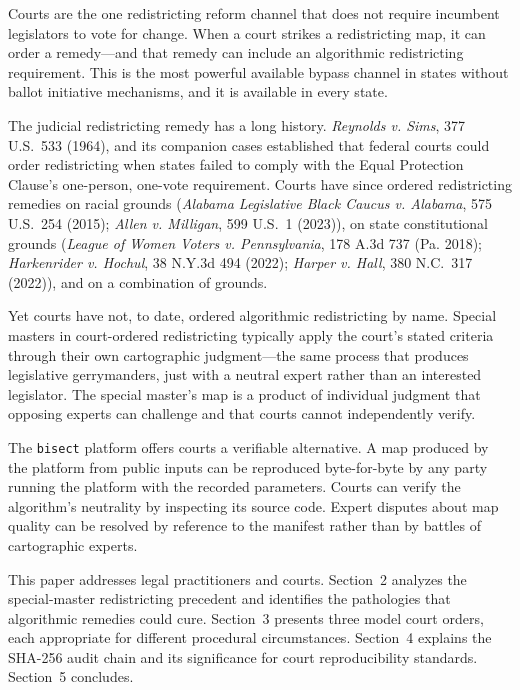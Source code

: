 Courts are the one redistricting reform channel that does not require incumbent legislators to vote for change. When a court strikes a redistricting map, it can order a remedy---and that remedy can include an algorithmic redistricting requirement. This is the most powerful available bypass channel in states without ballot initiative mechanisms, and it is available in every state.

The judicial redistricting remedy has a long history. \textit{Reynolds v. Sims}, 377 U.S.\ 533 (1964), and its companion cases established that federal courts could order redistricting when states failed to comply with the Equal Protection Clause's one-person, one-vote requirement. Courts have since ordered redistricting remedies on racial grounds (\textit{Alabama Legislative Black Caucus v. Alabama}, 575 U.S.\ 254 (2015); \textit{Allen v. Milligan}, 599 U.S.\ 1 (2023)), on state constitutional grounds (\textit{League of Women Voters v. Pennsylvania}, 178 A.3d 737 (Pa. 2018); \textit{Harkenrider v. Hochul}, 38 N.Y.3d 494 (2022); \textit{Harper v. Hall}, 380 N.C.\ 317 (2022)), and on a combination of grounds.

Yet courts have not, to date, ordered algorithmic redistricting by name. Special masters in court-ordered redistricting typically apply the court's stated criteria through their own cartographic judgment---the same process that produces legislative gerrymanders, just with a neutral expert rather than an interested legislator. The special master's map is a product of individual judgment that opposing experts can challenge and that courts cannot independently verify.

The \texttt{bisect} platform offers courts a verifiable alternative. A map produced by the platform from public inputs can be reproduced byte-for-byte by any party running the platform with the recorded parameters. Courts can verify the algorithm's neutrality by inspecting its source code. Expert disputes about map quality can be resolved by reference to the manifest rather than by battles of cartographic experts.

This paper addresses legal practitioners and courts. Section~2 analyzes the special-master redistricting precedent and identifies the pathologies that algorithmic remedies could cure. Section~3 presents three model court orders, each appropriate for different procedural circumstances. Section~4 explains the SHA-256 audit chain and its significance for court reproducibility standards. Section~5 concludes.
